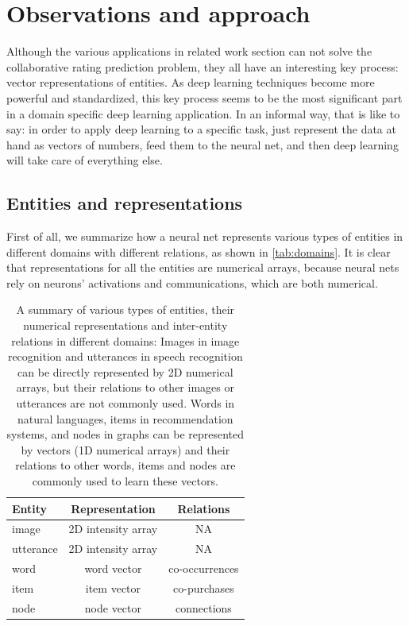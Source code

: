\documentclass[twocolumn]{article}
\begin{document}
\section{Observations and approach}
Although the various applications in related work section can not solve the 
collaborative rating prediction problem,
they all have an interesting key process: vector representations of entities.
As deep learning techniques become more powerful and standardized, this key 
process seems to be the most significant part in a domain specific deep 
learning application.
In an informal way, that is like to say: in order to apply deep learning to a 
specific task, just represent the data at hand as vectors of numbers,
feed them to the neural net, and then deep learning will take care of 
everything else.

\subsection{Entities and representations}
First of all, we summarize how a neural net represents various types of 
entities in different domains with different relations, as shown in 
\autoref{tab:domains}.
It is clear that representations for all the entities are numerical arrays, 
because neural nets rely on neurons' activations and communications, which 
are both numerical.
\begin{table}[h]
	\centering
	\caption{A summary of various types of entities, their numerical
		representations and inter-entity relations in different domains:
		Images in image recognition and utterances in speech recognition can be 
		directly represented by 2D numerical arrays, 
		but their relations to other images or utterances are not commonly 
		used. 
		Words in natural languages, items in recommendation systems, and nodes 
		in graphs can be represented by vectors (1D numerical arrays) and their 
		relations to other words, items and nodes are commonly used to learn 
		these vectors.}
	\begin{tabularx}{0.5\textwidth}{|X|c|c| } \hline \rowcolor{blue!50}
		Entity & Representation & Relations \\ \hline
		image & 2D intensity array & NA \\ \hline
		utterance & 2D intensity array & NA \\ \hline
		word & word vector & co-occurrences \\ \hline
		item & item vector & co-purchases \\ \hline
		node & node vector & connections \\ \hline
	\end{tabularx}
	\label{tab:domains}
\end{table}
\end{document}
